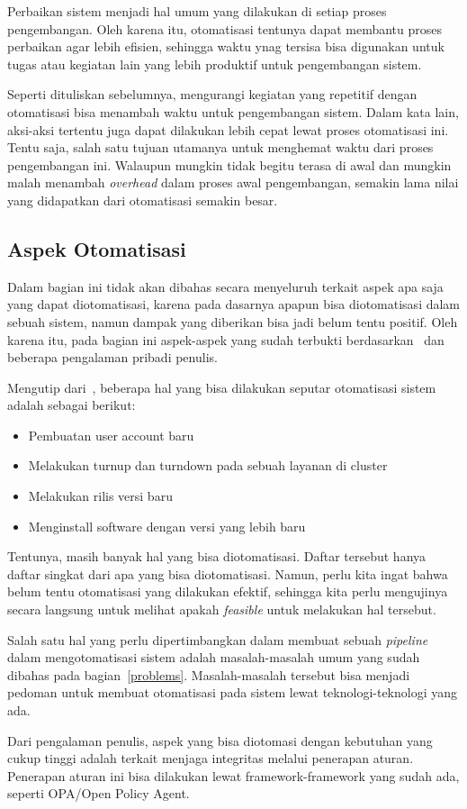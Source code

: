 Perbaikan sistem menjadi hal umum yang dilakukan di setiap proses pengembangan. Oleh karena itu, otomatisasi tentunya dapat membantu proses perbaikan agar lebih efisien, sehingga waktu ynag tersisa bisa digunakan untuk tugas atau kegiatan lain yang lebih produktif untuk pengembangan sistem.

Seperti dituliskan sebelumnya, mengurangi kegiatan yang repetitif dengan otomatisasi bisa menambah waktu untuk pengembangan sistem. Dalam kata lain, aksi-aksi tertentu juga dapat dilakukan lebih cepat lewat proses otomatisasi ini. Tentu saja, salah satu tujuan utamanya untuk menghemat waktu dari proses pengembangan ini. Walaupun mungkin tidak begitu terasa di awal dan mungkin malah menambah \textit{overhead} dalam proses awal pengembangan, semakin lama nilai yang didapatkan dari otomatisasi semakin besar.

\subsection{Aspek Otomatisasi}
Dalam bagian ini tidak akan dibahas secara menyeluruh terkait aspek apa saja yang dapat diotomatisasi, karena pada dasarnya apapun bisa diotomatisasi dalam sebuah sistem, namun dampak yang diberikan bisa jadi belum tentu positif. Oleh karena itu, pada bagian ini aspek-aspek yang sudah terbukti berdasarkan~\cite{beyer2016site} dan beberapa pengalaman pribadi penulis.

Mengutip dari~\cite{beyer2016site}, beberapa hal yang bisa dilakukan seputar otomatisasi sistem adalah sebagai berikut:
\begin{itemize}
  \item Pembuatan user account baru
  \item Melakukan turnup dan turndown pada sebuah layanan di cluster
  \item Melakukan rilis versi baru
  \item Menginstall software dengan versi yang lebih baru
\end{itemize}

Tentunya, masih banyak hal yang bisa diotomatisasi. Daftar tersebut hanya daftar singkat dari apa yang bisa diotomatisasi. Namun, perlu kita ingat bahwa belum tentu otomatisasi yang dilakukan efektif, sehingga kita perlu mengujinya secara langsung untuk melihat apakah \textit{feasible} untuk melakukan hal tersebut.

Salah satu hal yang perlu dipertimbangkan dalam membuat sebuah \textit{pipeline} dalam mengotomatisasi sistem adalah masalah-masalah umum yang sudah dibahas pada bagian~\ref{problems}. Masalah-masalah tersebut bisa menjadi pedoman untuk membuat otomatisasi pada sistem lewat teknologi-teknologi yang ada.

Dari pengalaman penulis, aspek yang bisa diotomasi dengan kebutuhan yang cukup tinggi adalah terkait menjaga integritas melalui penerapan aturan. Penerapan aturan ini bisa dilakukan lewat framework-framework yang sudah ada, seperti OPA/Open Policy Agent. 